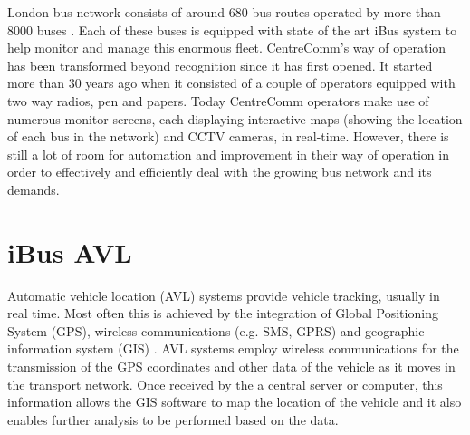 London bus network consists of around 680 bus routes operated by more than 8000 buses \cite{glads}. Each of these buses is equipped with state of the art iBus system to help monitor and manage this enormous fleet. CentreComm's way of operation has been transformed beyond recognition since it has first opened. It started more than 30 years ago \cite{centreComm} when it consisted of a couple of operators equipped with two way radios, pen and papers. Today CentreComm operators make use of numerous monitor screens, each displaying interactive maps (showing the location of each bus in the network) and CCTV cameras, in real-time. However, there is still a lot of room for automation and improvement in their way of operation in order to effectively and efficiently deal with the growing bus network and its demands.

\section{iBus AVL}
Automatic vehicle location (AVL) systems provide vehicle tracking, usually in real time. Most often this is achieved by the integration of Global Positioning System (GPS), wireless communications (e.g. SMS, GPRS) and geographic information system (GIS) \cite{riter1977automatic}. AVL systems employ wireless communications for the transmission of the GPS coordinates and other data of the vehicle as it moves in the transport network. Once received by the a central server or computer, this information allows the GIS software to map the location of the vehicle and it also enables further analysis to be performed based on the data.
 
